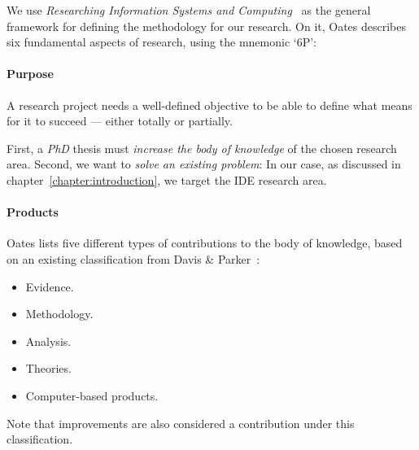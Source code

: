 We use \emph{Researching Information Systems and Computing}~\cite{Oates2006} as the
general framework for defining the methodology for our research. On it, Oates describes
six fundamental aspects of research, using the mnemonic `6P':


\paragraph{Purpose}
\label{method:purpose}
A research project needs a well-defined objective to be able
to define what means for it to succeed --- either totally or partially.

First, a \emph{PhD} thesis must \emph{increase the body of knowledge}
of the chosen research area. Second, we want to \emph{solve an existing problem}:
In our case, as discussed in chapter~\ref{chapter:introduction}, we target the
\gls{IDE} research area.

\paragraph{Products}
\label{method:products}
Oates lists five different types of contributions to the body of knowledge, based on
an existing classification from Davis \& Parker~\cite{Oates2006,Davis1997}:

\begin{itemize}
    \item Evidence.
    \item Methodology.
    \item Analysis.
    \item Theories.
    \item Computer-based products.
\end{itemize}

Note that improvements are also considered a contribution under this classification.

